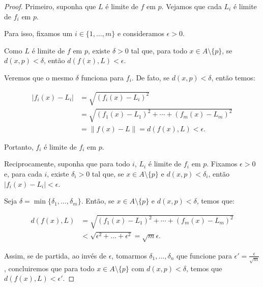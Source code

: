 \begin{proof}
    Primeiro, suponha que $L$ é limite de $f$ em $p$.
    Vejamos que cada $L_i$ é limite de $f_i$ em $p$.
    
    Para isso, fixamos um $i \in \{1, \dots, m\}$ e consideramos $\epsilon>0$.

    Como $L$ é limite de $f$ em $p$, existe $\delta>0$ tal que, para todo $x \in A\setminus\{p\}$, se $d(x, p) < \delta$, então $d(f(x), L) < \epsilon$.

    Veremos que o mesmo $\delta$ funciona para $f_i$.
    De fato, se $d(x, p) < \delta$, então temos:

    \begin{align*}
        |f_i(x) - L_i| &= \sqrt{(f_i(x) - L_i)^2} \\
        &= \sqrt{(f_1(x) - L_1)^2 + \cdots + (f_m(x) - L_m)^2} \\
        &= \|f(x) - L\| = d(f(x), L) < \epsilon.
    \end{align*}

    Portanto, $f_i$ é limite de $f_i$ em $p$.

    Reciprocamente, suponha que para todo $i$, $L_i$ é limite de $f_i$ em $p$.
    Fixamos $\epsilon>0$ e, para cada $i$, existe $\delta_i>0$ tal que, se $x \in A\setminus\{p\}$ e $d(x, p) < \delta_i$, então $|f_i(x) - L_i| < \epsilon$.

    Seja $\delta = \min\{\delta_1, \ldots, \delta_m\}$.
    Então, se $x \in A\setminus\{p\}$ e $d(x, p) < \delta$, temos que:

    \begin{align*}
        d(f(x), L) &= \sqrt{(f_1(x) - L_1)^2 + \cdots + (f_m(x) - L_m)^2} \\
        &< \sqrt{\epsilon^2+\dots+\epsilon^2}= \sqrt{m}\epsilon.
    \end{align*}

    Assim, se de partida, ao invés de $\epsilon$, tomarmos $\delta_1, \dots, \delta_n$ que funcione para $\epsilon'=\frac{\epsilon}{\sqrt{m}}$, concluiremos que para todo $x \in A\setminus\{p\}$ com $d(x, p) < \delta$, temos que $d(f(x), L) < \epsilon'$.
\end{proof}

